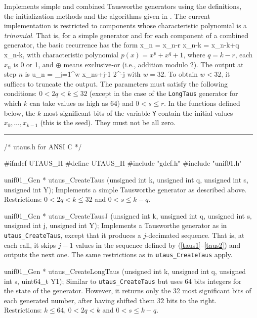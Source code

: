 
Implements simple and combined Tausworthe generators using
the definitions, the initialization methods and the
 algorithms given in \cite{rLEC94a,rLEC96a}.
The current implementation is restricted to components whose
characteristic polynomial is a {\em trinomial}.  That is,
for a  simple generator and for each component of a combined
generator, the basic recurrence has the form %
\eq                                               {}
  x_n = x_{n-r} \oplus x_{n-k} = x_{n-k+q} \oplus x_{n-k},
\endeq
with characteristic polynomial $p(x) = x^p + x^q + 1$,
where $q = k-r$, each $x_n$ is 0 or 1, and $\oplus$
means exclusive-or (i.e., addition modulo 2).
The output at step $n$ is
\eq                                               {}
  u_n = \sum_{j=1}^w x_{ns+j-1} 2^{-j}
\endeq
with $w = 32$.
To obtain $w < 32$, it suffices to truncate the output.
The parameters must satisfy the following conditions:
$0 < 2q < k \le 32$ (except in the case of the {\tt LongTaus} generator
for which $k$ can take values as high as 64) and $0 < s \le r$.
In the functions defined below, the $k$ most significant
bits of the variable {\tt Y} contain
the initial values  $x_0,\dots,x_{k-1}$ (this is the seed).
They must not be all zero.

\bigskip
\hrule
\code
\hide
/* utaus.h for ANSI C */

#ifndef UTAUS_H
#define UTAUS_H
\endhide
#include "gdef.h"
#include "unif01.h"


unif01_Gen * utaus_CreateTaus (unsigned int k, unsigned int q,
                               unsigned int s, unsigned int Y);
\endcode
  \tab  Implements a simple Tausworthe generator as described above.
   Restrictions: $0 < 2q < k \le 32$ and $0 < s \le k-q$.
  \endtab
\code


unif01_Gen * utaus_CreateTausJ (unsigned int k, unsigned int q,
                                unsigned int s, unsigned int j,
                                unsigned int Y);
\endcode
  \tab  Implements a Tausworthe generator as in {\tt utaus\_CreateTaus},
   except that it produces a $j$-decimated sequence.
   That is, at each call, it skips $j-1$ values in the sequence
   defined by (\ref{taus1}--\ref{taus2}) and outputs the next one.
   The same restrictions as in {\tt utaus\_CreateTaus} apply.
  \endtab
\code


unif01_Gen * utaus_CreateLongTaus (unsigned int k, unsigned int q,
                                   unsigned int s, uint64_t Y1);
\endcode
  \tab    Similar to {\tt utaus\_CreateTaus} but uses
   64 bits integers for the state of the generator. However, it returns
   only the 32 most significant bits of each  generated number, after
   having shifted them 32 bits to the right.
   Restrictions: $k \le 64$, $0 < 2q < k$ and $0 < s \le k-q$.
  \endtab
\code


